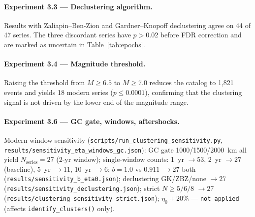 \documentclass[draft]{agujournal2019}
\begin{document}
\paragraph{Experiment 3.3 --- Declustering algorithm.}
Results with Zaliapin--Ben-Zion \citep{ZaliapinBenZion2016} and
Gardner--Knopoff \citep{Gardner1974} declustering agree on 44 of 47
series.  The three discordant series have $p > 0.02$ before FDR correction
and are marked as uncertain in Table~\ref{tab:epochs}.

\paragraph{Experiment 3.4 --- Magnitude threshold.}
Raising the threshold from $M \ge 6.5$ to $M \ge 7.0$ reduces the catalog
to 1{,}821 events and yields 18 modern series ($p \le 0.0001$), confirming
that the clustering signal is not driven by the lower end of the magnitude
range.

\paragraph{Experiment 3.6 --- GC gate, windows, aftershocks.}
Modern-window sensitivity (\texttt{scripts/run\_clustering\_sensitivity.py},
\texttt{results/sensitivity\_eta\_windows\_gc.json}):
GC gate 1000/1500/2000~km all yield $N_\mathrm{series}=27$ (2-yr window);
single-window counts: 1~yr $\to 53$, 2~yr $\to 27$ (baseline), 5~yr $\to 11$,
10~yr $\to 6$; $b=1.0$ vs $0.911$ $\to 27$ both
(\texttt{results/sensitivity\_b\_eta0.json}); declustering GK/ZBZ/none $\to 27$
(\texttt{results/sensitivity\_declustering.json}); strict $N\ge 5/6/8$ $\to 27$
(\texttt{results/clustering\_sensitivity\_strict.json}); $\eta_0 \pm 20\%$
--- \texttt{not\_applied} (affects \texttt{identify\_clusters()} only).
\end{document}
